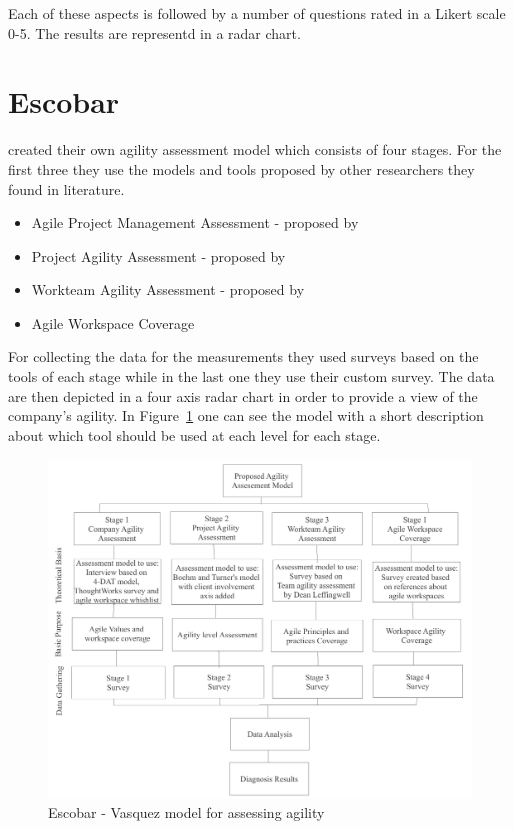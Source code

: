 Each of these aspects is followed by a number of questions rated in a Likert scale 0-5. The results are representd in a radar chart.


\section{Escobar}

\citet{6427226} created their own agility assessment model which consists of four stages. For the first three they use the models and tools proposed by other researchers they found in literature.
\begin{itemize}
\item Agile Project Management Assessment - proposed by \citet{qumer2006measuring}
\item Project Agility Assessment - proposed by \citet{taylor}
\item Workteam Agility Assessment - proposed by \citet{Leffingwell}
\item Agile Workspace Coverage
\end{itemize}

For collecting the data for the measurements they used surveys based on the tools of each stage while in the last one they use their custom survey. The data are then depicted in a four axis radar chart in order to provide a view of the company's agility. In Figure~\ref{escobar_model} one can see the model with a short description about which tool should be used at each level for each stage.

\begin{figure} [H]
\centerline{\includegraphics[scale=0.75]{include/relatedwork/fig/escobar_model.pdf}}
\caption{Escobar - Vasquez model for assessing agility} 
\label{escobar_model}
\end{figure}

